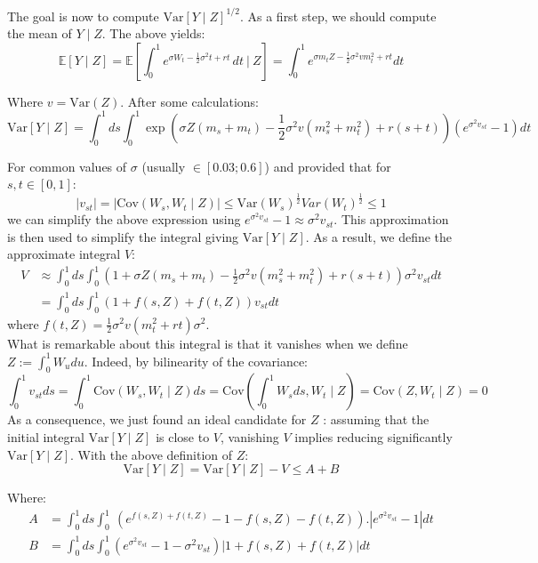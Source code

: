 \documentclass{article}
\begin{document}
The goal is now to compute $\mathrm{Var}[Y\mid Z]^{1/2}$.
As a first step, we should compute the mean of $Y \mid Z$. The above yields:
\begin{equation}
\mathbb{E}[Y\mid Z]=\mathbb{E}\left[\int_{0}^{1} e^{\sigma W_{t}-{\textstyle\frac{1}{2}}\sigma^{2}t+r t}\,dt
\ \Big\vert \ Z \right]=\int_{0}^{1} e^{\sigma m_t Z-{\textstyle\frac{1}{2}}\sigma^{2}v m_{t}^{2}+r t}dt
\tag{V}
\end{equation}

Where $v=\mathrm{Var}(Z)$. After some calculations:
\[
\mathrm{Var}[Y\mid Z]=\int_{0}^{1}d s\int_{0}^{1}\exp(\sigma Z(m_{s}+m_{t})-{\textstyle{\frac{1}{2}}}\sigma^{2}v(m_{s}^{2}+m_{t}^{2})+r(s+t))(e^{\sigma^{2}v_{s t}}-1)d t
\]

For common values of $\sigma$ (usually $\in[0.03;0.6]$) and provided that for $s,t \in [0,1]$:
\[
	| v_{st} | = | \mathrm{Cov} (W_s,W_t\mid Z)| \leq \mathrm{Var}(W_s)^{\frac{1}{2}} Var(W_t)^{\frac{1}{2}}\leq 1
\]
we can simplify the above expression using $e^{\sigma^{2}v_{s t}}-1\approx \sigma^{2}v_{s t}$.
This approximation is then used to simplify the integral giving $\mathrm{Var}[Y\mid Z]$.
As a result, we define the approximate integral $V$:
\begin{align*}
	V &\approx \int_{0}^{1} ds\int_{0}^{1}(1+\sigma Z(m_{s}+m_{t})-{\textstyle\frac{1}{2}}
	\sigma^{2}v(m_{s}^{2}+m_{t}^{2})	+r(s+t))\sigma^{2}v_{s t}d t \\
	&=\int_{0}^{1}ds\int_{0}^{1} (1+f(s,Z)+f(t,Z))v_{s t}dt
\end{align*}
where $f(t,Z)=\textstyle\frac{1}{2}\sigma^{2}v(m_{t}^{2}+rt)\sigma^{2}$.
\\

What is remarkable about this integral is that it vanishes when we define $Z := \int_{0}^{1}W_u du$.
Indeed, by bilinearity of the covariance:\\
\[
    \int_{0}^{1}v_{st}ds
    =\int_{0}^{1}\mathrm{Cov}(W_s,W_t\mid Z)ds
    =\mathrm{Cov} \left( \int_{0}^{1}W_s ds,W_t\mid Z \right)
    =\mathrm{Cov}(Z,W_t\mid Z)
    =0
\]
As a consequence, we just found an ideal candidate for $Z$ : assuming that the initial integral
$\mathrm{Var}[Y\mid Z]$ is close to $V$, vanishing $V$ implies reducing significantly $\mathrm{Var}[Y\mid Z]$.
With the above definition of $Z$:
\[
  \mathrm{Var}[Y\mid Z]= \mathrm{Var}[Y\mid Z]-V\leq A+B 
\]

Where:
\begin{align*}
    A&=\int_{0}^{1}d s\int_{0}^{1}\ (e^{f(s,Z)+f(t,Z)}-1-f(s,Z)-f(t,Z)).|e^{\sigma^{2}v_{s t}}-1|d t\\
    B&=\int_{0}^{1}d s\int_{0}^{1}(e^{\sigma^{2}v_{s t}}-1-\sigma^{2}v_{s t}) | 1+f(s,Z)+f(t,Z) | dt
\end{align*}
\end{document}
